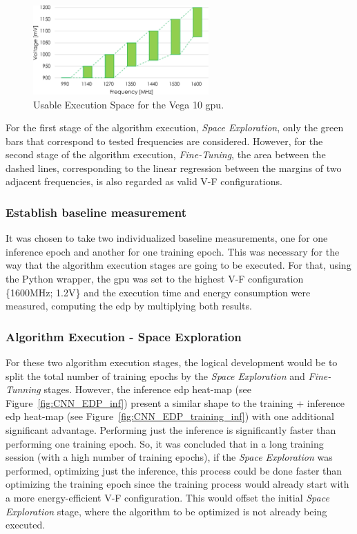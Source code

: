 \begin{figure}[htb]
    \centering
        \includegraphics[width=0.6\textwidth]{Figures/Application To Deep Learning/UES.pdf}
        \caption{Usable Execution Space for the Vega 10 \acrshort{gpu}.}
    \label{fig:ues}
\end{figure}



For the first stage of the algorithm execution, \textit{Space Exploration}, only the green bars that correspond to tested frequencies are considered. However, for the second stage of the algorithm execution, \textit{Fine-Tuning}, the area between the dashed lines, corresponding to the linear regression between the margins of two adjacent frequencies, is also regarded as valid V-F configurations.

\subsubsection{Establish baseline measurement}

It was chosen to take two individualized baseline measurements, one for one inference epoch and another for one training epoch. This was necessary for the way that the algorithm execution stages are going to be executed. For that, using the Python wrapper, the \acrshort{gpu} was set to the highest V-F configuration \{1600MHz; 1.2V\} and the execution time and energy consumption were measured, computing the \acrshort{edp} by multiplying both results.

\subsubsection{Algorithm Execution - Space Exploration}

For these two algorithm execution stages, the logical development would be to split the total number of training epochs by the \textit{Space Exploration} and \textit{Fine-Tunning} stages. However, the inference \acrshort{edp} heat-map (see Figure~\ref{fig:CNN_EDP_inf}) present a similar shape to the training + inference \acrshort{edp} heat-map (see Figure~\ref{fig:CNN_EDP_training_inf}) with one additional significant advantage. Performing just the inference is significantly faster than performing one training epoch. So, it was concluded that in a long training session (with a high number of training epochs), if the \textit{Space Exploration} was performed, optimizing just the inference, this process could be done faster than optimizing the training epoch since the training process would already start with a more energy-efficient V-F configuration. This would offset the initial \textit{Space Exploration} stage, where the algorithm to be optimized is not already being executed.

